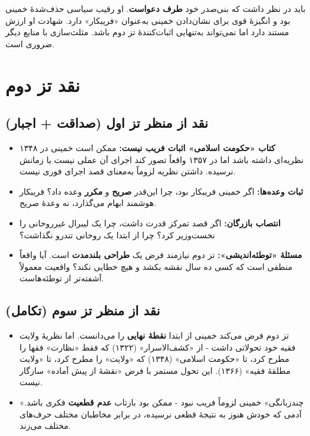 \documentclass[12pt,a4paper]{book}
\newcommand{\keyword}[1]{\textbf{\textcolor{cPrimary}{#1}}}
\begin{document}
\begin{warningBox}
باید در نظر داشت که بنی‌صدر خود \keyword{طرف دعواست}. او رقیب سیاسی حذف‌شدهٔ خمینی بود و انگیزهٔ قوی برای نشان‌دادن خمینی به‌عنوان «فریبکار» دارد. شهادت او ارزش مستند دارد اما نمی‌تواند به‌تنهایی اثبات‌کنندهٔ تز دوم باشد. مثلث‌سازی با منابع دیگر ضروری است.
\end{warningBox}

\section{نقد تز دوم}

\subsection{نقد از منظر تز اول (صداقت + اجبار)}

\begin{itemize}[label=\textcolor{cGreen}{$\checkmark$}, rightmargin=2em]
    \item \textbf{کتاب «حکومت اسلامی» اثبات فریب نیست:} ممکن است خمینی در ۱۳۴۸ نظریه‌ای داشته باشد اما در ۱۳۵۷ واقعاً تصور کند اجرای آن عملی نیست یا زمانش نرسیده. داشتن نظریه لزوماً به‌معنای قصد اجرای فوری نیست.
    \item \textbf{ثبات وعده‌ها:} اگر خمینی فریبکار بود، چرا این‌قدر \keyword{صریح} و \keyword{مکرر} وعده داد؟ فریبکار هوشمند ابهام می‌گذارد، نه وعدهٔ صریح.
    \item \textbf{انتصاب بازرگان:} اگر قصد تمرکز قدرت داشت، چرا یک لیبرال‌ غیرروحانی را نخست‌وزیر کرد؟ چرا از ابتدا یک روحانی تندرو نگذاشت؟
    \item \textbf{مسئلهٔ «توطئه‌اندیشی»:} تز دوم نیازمند فرض یک \keyword{طراحی بلندمدت} است. آیا واقعاً منطقی است که کسی ده سال نقشه بکشد و هیچ خطایی نکند؟ واقعیت معمولاً آشفته‌تر از توطئه‌هاست.
\end{itemize}

\subsection{نقد از منظر تز سوم (تکامل)}

\begin{itemize}[label=\textcolor{cGold}{$\checkmark$}, rightmargin=2em]
    \item تز دوم فرض می‌کند خمینی از ابتدا \keyword{نقطهٔ نهایی} را می‌دانست. اما نظریهٔ ولایت فقیه خود تحولاتی داشت - از «کشف‌الاسرار» (۱۳۲۲) که فقط «نظارت» فقها را مطرح کرد، تا «حکومت اسلامی» (۱۳۴۸) که «ولایت» را مطرح کرد، تا «ولایت مطلقهٔ فقیه» (۱۳۶۶). این تحول مستمر با فرض «نقشهٔ از پیش آماده» سازگار نیست.
    \item «چندزبانگی» خمینی لزوماً فریب نبود - ممکن بود بازتاب \keyword{عدم قطعیت} فکری باشد. آدمی که خودش هنوز به نتیجهٔ قطعی نرسیده، در برابر مخاطبان مختلف حرف‌های مختلف می‌زند.
\end{itemize}
\end{document}
